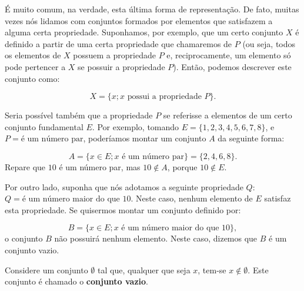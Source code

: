É muito comum, na verdade, esta última forma de representação. De fato, muitas vezes nós lidamos com conjuntos formados por elementos que satisfazem a alguma certa propriedade. Suponhamos, por exemplo, que um certo conjunto $X$ é definido a partir de uma certa propriedade que chamaremos de $P$ (ou seja, todos os elementos de $X$ possuem a propriedade $P$ e, reciprocamente, um elemento só pode pertencer a $X$ se possuir a propriedade $P$). Então, podemos descrever este conjunto como:

$$
X = \{x; \text{$x$ possui a propriedade $P$}\}.
$$

Seria possível também que a propriedade $P$ se referisse a elementos de um certo conjunto fundamental $E$. Por exemplo, tomando $E = \{1, 2, 3, 4, 5, 6, 7, 8\}$, e $P = \text{é um número par}$, poderíamos montar um conjunto $A$ da seguinte forma:

$$
A = \{x\in E; \text{$x$ é um número par}\} = \{2, 4, 6, 8\}.
$$
Repare que $10$ é um número par, mas $10\notin A$, porque $10\notin E$.

Por outro lado, suponha que nós adotamos a seguinte propriedade $Q$: $Q = \text{é um número maior do que 10}$. Neste caso, nenhum elemento de $E$ satisfaz esta propriedade. Se quisermos montar um conjunto definido por:

$$
B = \{x\in E; \text{$x$ é um número maior do que 10}\},
$$
o conjunto $B$ não possuirá nenhum elemento. Neste caso, dizemos que $B$ é um conjunto vazio.

\begin{Definition}
	Considere um conjunto $\emptyset$ tal que, qualquer que seja $x$, tem-se $x\notin\emptyset$. Este conjunto é chamado o \textbf{conjunto vazio}.
\end{Definition}